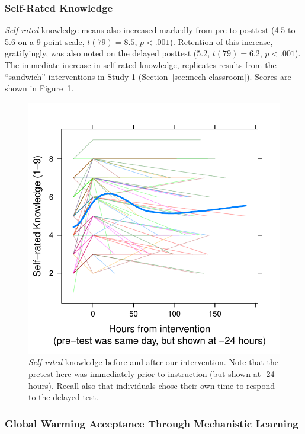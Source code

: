 \subsubsection{Self-Rated Knowledge}

\emph{Self-rated} knowledge means also increased markedly from pre to posttest (4.5
to 5.6 on a 9-point scale, $t(79)=8.5$, $p<.001$). Retention of this increase,
gratifyingly, was also noted on the delayed posttest (5.2, $t(79)=6.2$,
$p<.001$). The immediate increase in self-rated knowledge, replicates
results from the ``sandwich'' interventions in Study 1
(Section~\ref{sec:mech-classroom}). Scores are shown in
Figure~\ref{fig:RPP-mech-self}.

\begin{figure}
    \centering
    \includegraphics{RPP-mech-self.pdf}
    \caption{\emph{Self-rated} knowledge before and after our intervention. Note that the
        pretest here was immediately prior to instruction (but shown at -24
        hours). Recall also that individuals chose their own time to respond to
        the delayed test.}
    \label{fig:RPP-mech-self}
\end{figure}

\subsubsection{Global Warming Acceptance Through Mechanistic Learning}

